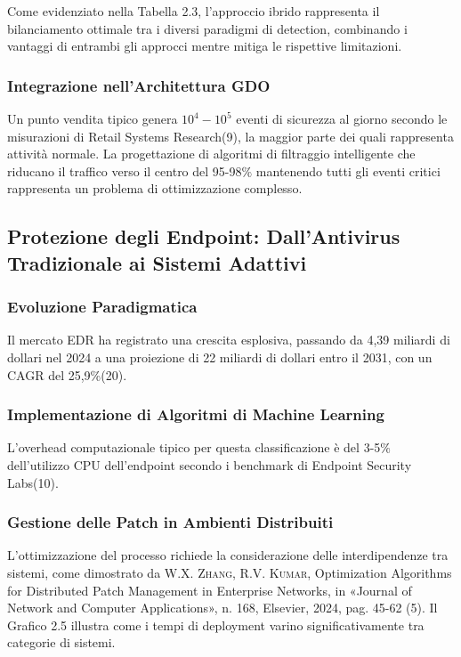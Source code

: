 \documentclass[12pt,a4paper,oneside]{book}
\newcommand{\autore}[1]{\textsc{#1}}
\newcommand{\citarticolo}[7]{%
    \autore{#1}, #2, in «#3», n. #4, #5, #6, pag. #7%
}
\begin{document}
Come evidenziato nella Tabella 2.3, l'approccio ibrido rappresenta il bilanciamento ottimale tra i diversi paradigmi di detection, combinando i vantaggi di entrambi gli approcci mentre mitiga le rispettive limitazioni.

\subsubsection{Integrazione nell'Architettura GDO}

Un punto vendita tipico genera $10^4-10^5$ eventi di sicurezza al giorno secondo le misurazioni di Retail Systems Research(9), la maggior parte dei quali rappresenta attività normale. La progettazione di algoritmi di filtraggio intelligente che riducano il traffico verso il centro del 95-98$\%$ mantenendo tutti gli eventi critici rappresenta un problema di ottimizzazione complesso.

\subsection{Protezione degli Endpoint: Dall'Antivirus Tradizionale ai Sistemi Adattivi}

\subsubsection{Evoluzione Paradigmatica}

Il mercato EDR ha registrato una crescita esplosiva, passando da 4,39 miliardi di dollari nel 2024 a una proiezione di 22 miliardi di dollari entro il 2031, con un CAGR del 25,9\%(20).

\subsubsection{Implementazione di Algoritmi di Machine Learning}

L'overhead computazionale tipico per questa classificazione è del 3-5$\%$ dell'utilizzo CPU dell'endpoint secondo i benchmark di Endpoint Security Labs(10).

\subsubsection{Gestione delle Patch in Ambienti Distribuiti}

L'ottimizzazione del processo richiede la considerazione delle interdipendenze tra sistemi, come dimostrato da \citarticolo{W.X. Zhang, R.V. Kumar}{Optimization Algorithms for Distributed Patch Management in Enterprise Networks}{Journal of Network and Computer Applications}{168}{Elsevier}{2024}{45-62}(5). Il Grafico 2.5 illustra come i tempi di deployment varino significativamente tra categorie di sistemi.
\end{document}
